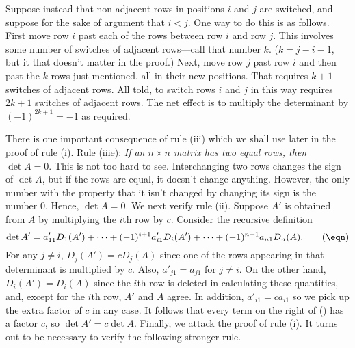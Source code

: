 Suppose instead that non-adjacent rows in positions $i$ and $j$
are switched, 
and  suppose for the sake of argument
that $i < j$.  One way to do this is as follows.  First
move row $i$ past each of the rows between row $i$ and row $j$.  This
involves some number of switches of adjacent rows---call that
number $k$.  ($k = j - i - 1$, but
it that doesn't matter in the proof.)   Next, move
row $j$ past row $i$ and then past the $k$ rows just mentioned, 
all in their new positions.   That requires  $k + 1$ switches
of adjacent rows.  All told, to switch rows $i$ and $j$ in this
way requires $2k + 1$ switches of adjacent rows.  The net effect
is to multiply the determinant by $(-1)^{2k +1} = -1$ as required.

There is one important consequence of rule (iii) which we shall use
later in the proof of rule (i).
\medskip
\noindent
Rule (iiie):  {\it  If an $n\times n$ matrix has two equal rows,
then $\det A = 0$}.
\medskip
This is not too hard to see.   Interchanging two rows changes the
sign of $\det A$, but if the rows are equal, it doesn't change
anything.  However, the only number with the property that it
isn't changed by changing its sign is the number 0.  Hence,
$\det A = 0$.
\medskip
We next verify rule (ii).   Suppose $A'$ is obtained from
$A$ by multiplying the $i$th row by $c$.   Consider the
recursive definition
\nexteqn
$$
\det A'
= a'_{11}D_1(A') + \dots + (-1)^{i+1}a'_{i1}D_i(A') + \dots
+ (-1)^{n+1}a_{n1}D_n(A).\tag\eqn
$$
For any $j \not= i$, $D_j(A') = c D_j(A)$ since one of the
rows appearing in that determinant is multiplied by $c$.
Also, $a'_{j1} = a_{j1}$ for $j \not = i$.   On the other hand,
$D_i(A') = D_i(A)$ since the $i$th row  is
deleted in calculating these quantities, and, except for the $i$th row,
$A'$ and $A$ agree. In addition, $a'_{i1} = ca_{i1}$ so we
pick up the extra factor of $c$ in any case.  It follows that
every term on the right of (\eqn) has a factor $c$, so
$\det A' = c\det A$.
\medskip
Finally, we attack the proof of rule (i).  It turns out to
be necessary to verify the following stronger rule.
\medskip

